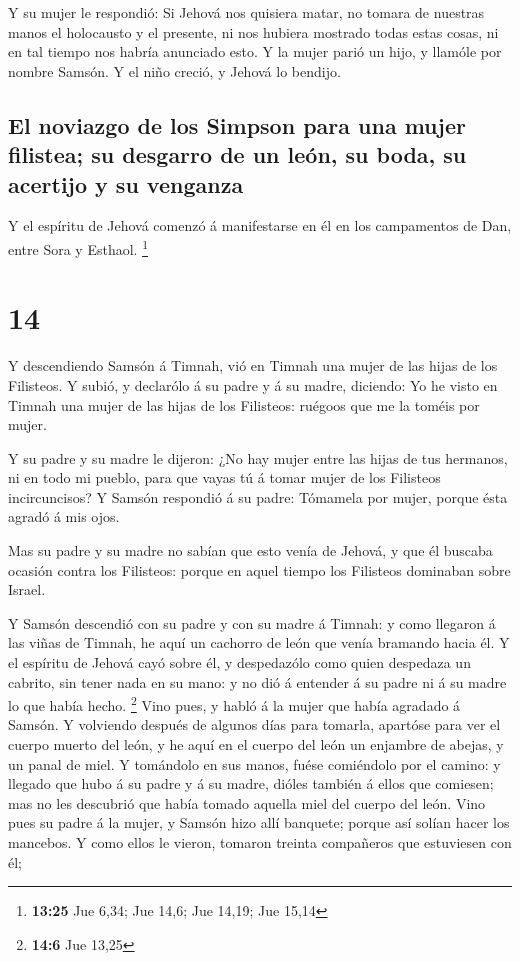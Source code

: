  Y su mujer le respondió: Si Jehová nos quisiera matar, no
tomara de nuestras manos el holocausto y el presente, ni nos hubiera
mostrado todas estas cosas, ni en tal tiempo nos habría anunciado esto.
 Y la mujer parió un hijo, y llamóle por nombre Samsón. Y
el niño creció, y Jehová lo bendijo.

\hypertarget{el-noviazgo-de-los-simpson-para-una-mujer-filistea-su-desgarro-de-un-leuxf3n-su-boda-su-acertijo-y-su-venganza}{%
\subsection{El noviazgo de los Simpson para una mujer filistea; su
desgarro de un león, su boda, su acertijo y su
venganza}\label{el-noviazgo-de-los-simpson-para-una-mujer-filistea-su-desgarro-de-un-leuxf3n-su-boda-su-acertijo-y-su-venganza}}

 Y el espíritu de Jehová comenzó á manifestarse en él en
los campamentos de Dan, entre Sora y Esthaol. \footnote{\textbf{13:25}
  Jue 6,34; Jue 14,6; Jue 14,19; Jue 15,14}

\hypertarget{section-13}{%
\section{14}\label{section-13}}

 Y descendiendo Samsón á Timnah, vió en Timnah una mujer de
las hijas de los Filisteos.  Y subió, y declarólo á su padre
y á su madre, diciendo: Yo he visto en Timnah una mujer de las hijas de
los Filisteos: ruégoos que me la toméis por mujer.

 Y su padre y su madre le dijeron: ¿No hay mujer entre las
hijas de tus hermanos, ni en todo mi pueblo, para que vayas tú á tomar
mujer de los Filisteos incircuncisos? Y Samsón respondió á su padre:
Tómamela por mujer, porque ésta agradó á mis ojos.

 Mas su padre y su madre no sabían que esto venía de Jehová,
y que él buscaba ocasión contra los Filisteos: porque en aquel tiempo
los Filisteos dominaban sobre Israel.

 Y Samsón descendió con su padre y con su madre á Timnah: y
como llegaron á las viñas de Timnah, he aquí un cachorro de león que
venía bramando hacia él.  Y el espíritu de Jehová cayó sobre
él, y despedazólo como quien despedaza un cabrito, sin tener nada en su
mano: y no dió á entender á su padre ni á su madre lo que había hecho.
\footnote{\textbf{14:6} Jue 13,25}  Vino pues, y habló á la
mujer que había agradado á Samsón.  Y volviendo después de
algunos días para tomarla, apartóse para ver el cuerpo muerto del león,
y he aquí en el cuerpo del león un enjambre de abejas, y un panal de
miel.  Y tomándolo en sus manos, fuése comiéndolo por el
camino: y llegado que hubo á su padre y á su madre, dióles también á
ellos que comiesen; mas no les descubrió que había tomado aquella miel
del cuerpo del león.  Vino pues su padre á la mujer, y
Samsón hizo allí banquete; porque así solían hacer los mancebos.
 Y como ellos le vieron, tomaron treinta compañeros que
estuviesen con él;

